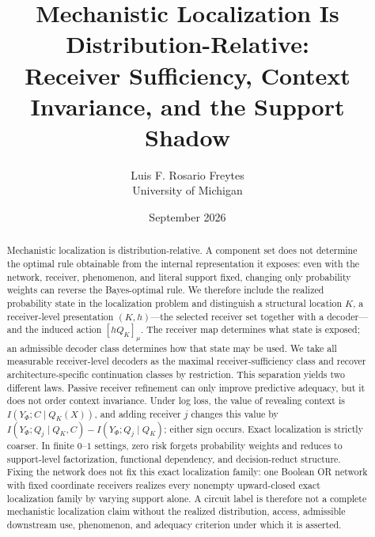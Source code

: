 \documentclass[11pt]{article}
\title{Mechanistic Localization Is Distribution-Relative:\\Receiver Sufficiency, Context Invariance, and the Support Shadow}
\author{Luis F. Rosario Freytes\\University of Michigan}
\date{September 2026}
\begin{document}
\maketitle

\begin{abstract}
Mechanistic localization is distribution-relative. A component set does not determine the optimal rule obtainable from the internal representation it exposes: even with the network, receiver, phenomenon, and literal support fixed, changing only probability weights can reverse the Bayes-optimal rule. We therefore include the realized probability state in the localization problem and distinguish a structural location $K$, a receiver-level presentation $(K,h)$---the selected receiver set together with a decoder---and the induced action $[hQ_K]_\mu$. The receiver map determines what state is exposed; an admissible decoder class determines how that state may be used. We take all measurable receiver-level decoders as the maximal receiver-sufficiency class and recover architecture-specific continuation classes by restriction. This separation yields two different laws. Passive receiver refinement can only improve predictive adequacy, but it does not order context invariance. Under log loss, the value of revealing context is $I(Y_\Phi;C\mid Q_K(X))$, and adding receiver $j$ changes this value by $I(Y_\Phi;Q_j\mid Q_K,C)-I(Y_\Phi;Q_j\mid Q_K)$; either sign occurs. Exact localization is strictly coarser. In finite $0$--$1$ settings, zero risk forgets probability weights and reduces to support-level factorization, functional dependency, and decision-reduct structure. Fixing the network does not fix this exact localization family: one Boolean OR network with fixed coordinate receivers realizes every nonempty upward-closed exact localization family by varying support alone. A circuit label is therefore not a complete mechanistic localization claim without the realized distribution, access, admissible downstream use, phenomenon, and adequacy criterion under which it is asserted.
\end{abstract}






\end{document}
